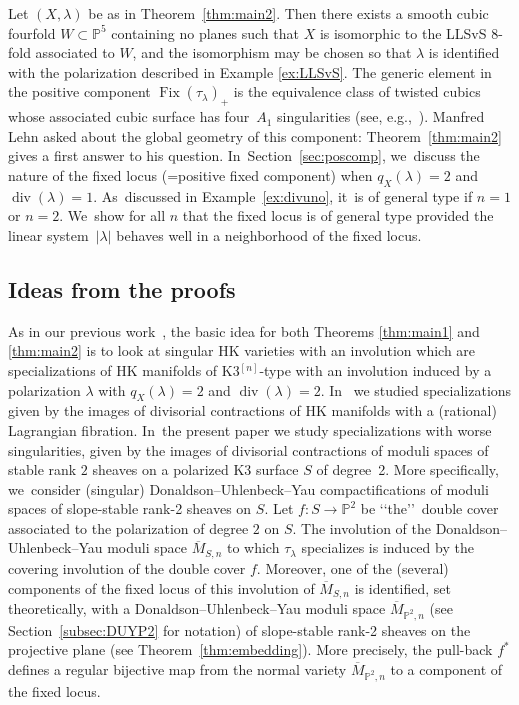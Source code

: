 \documentclass[JEP,XML,SOM,Unicode,published]{cedram}
\newcommand{\HK}{\textup{HK}\xspace}
\newcommand{\PP}{{\mathbb P}}\let\P\PP
\DeclareMathOperator{\divisore}{div}\let\div\divisore
\DeclareMathOperator{\Fix}{Fix}
\let\ov\overline
\theoremstyle{definition}
\begin{document}
Let $(X,\lambda)$ be as in Theorem~\ref{thm:main2}.
Then there exists a smooth cubic fourfold $W\subset\PP^5$ containing no planes such that $X$ is isomorphic to the LLSvS $8$-fold associated to $W$, and the isomorphism may be chosen so that $\lambda$ is identified with the polarization described in Example \ref{ex:LLSvS}.
The generic element in the positive component $\Fix(\tau_{\lambda})_+$ is the equivalence class of twisted cubics whose associated cubic surface has four~$A_1$ singularities (see, e.g.,~\cite{Lehn:Oberwolfach}).
Manfred Lehn asked about the global geometry of this component: Theorem~\ref{thm:main2} gives a first answer to his question. In~Section~\ref{sec:poscomp}, we~discuss the nature of the fixed locus (=positive fixed component) when $q_X(\lambda)=2$ and $\div(\lambda)=1$. As~discussed in Example~\ref{ex:divuno}, it~is of general type
if $n=1$ or $n=2$. We~show for all $n$ that the fixed locus is of general type provided the linear system~$|\lambda|$ behaves well in a neighborhood of the fixed locus.

\subsection{Ideas from the proofs}\label{subsec:IntroIdeaProof}

As in our previous work~\cite{involutions1}, the basic idea for both Theorems \ref{thm:main1} and \ref{thm:main2} is to look at singular \HK varieties with an involution which are specializations of \HK manifolds of K3$^{[n]}$-type with an involution induced by a polarization $\lambda$ with $q_X(\lambda)=2$ and $\divisore(\lambda)=2$.
In~\cite{involutions1} we studied specializations given by the images of divisorial contractions of \HK manifolds with a (rational) Lagrangian fibration. In~the present paper we study specializations with worse singularities, given by the images of divisorial contractions of moduli spaces of stable rank $2$ sheaves on a polarized K3 surface $S$ of degree~2.
More specifically, we~consider (singular) Donaldson--Uhlenbeck--Yau compactifications of moduli spaces of slope-stable rank-2 sheaves on $S$. Let $f\colon S\to \PP^2$ be \lq\lq the\rq\rq\ double cover associated to the polarization of degree $2$ on $S$.
The involution of the Donaldson--Uhlenbeck--Yau moduli space $\ov{M}_{S,n}$ to which $\tau_\lambda$ specializes is induced by the covering involution of the double cover $f$.
Moreover, one of the (several) components of the fixed locus of this involution of $\ov{M}_{S,n}$ is identified, set theoretically, with a Donaldson--Uhlenbeck--Yau moduli space $\ov{M}_{\PP^2,n}$ (see Section~\ref{subsec:DUYP2} for notation) of slope-stable rank-2 sheaves on the projective plane (see Theorem~\ref{thm:embedding}).
More precisely, the pull-back $f^{*}$ defines a regular bijective map from the normal variety $\ov{M}_{\PP^2,n}$ to a component of the fixed locus.
\end{document}

